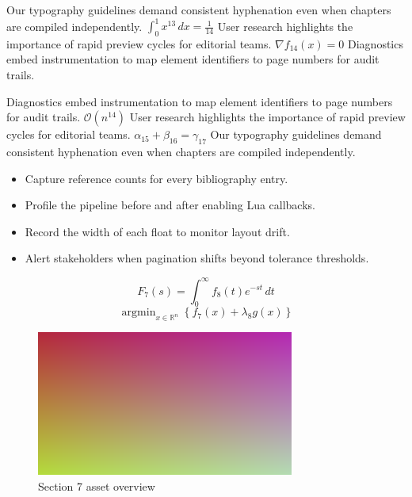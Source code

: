     Our typography guidelines demand consistent hyphenation even when chapters are compiled independently.  $\int_{0}^{1} x^{13} \, dx = \frac{1}{14}$  User research highlights the importance of rapid preview cycles for editorial teams.  $\nabla f_{14}(x) = 0$  Diagnostics embed instrumentation to map element identifiers to page numbers for audit trails.
    \par
  
    Diagnostics embed instrumentation to map element identifiers to page numbers for audit trails.  $\mathcal{O}(n^{14})$  User research highlights the importance of rapid preview cycles for editorial teams.  $\alpha_{15} + \beta_{16} = \gamma_{17}$  Our typography guidelines demand consistent hyphenation even when chapters are compiled independently.
    \par
  
    \begin{itemize}
      
    \item Capture reference counts for every bibliography entry.
    \item Profile the pipeline before and after enabling Lua callbacks.
    \item Record the width of each float to monitor layout drift.
    \item Alert stakeholders when pagination shifts beyond tolerance thresholds.
    \end{itemize}
\begin{equation}
\label{eq:sec7-eq1}
F_{7}(s) = \int_{0}^{\infty} f_{8}(t) e^{-st} \, dt
\end{equation}
\[
\operatorname{argmin}_{x \in \mathbb{R}^{n}} \left\{ f_{7}(x) + \lambda_{8} g(x) \right\}
\]

    \begin{figure}[htbp]
      \centering
      
          \includegraphics[width=0.82\linewidth]{../assets/images/placeholder2.png}
        
        \caption{Section 7 asset overview}
      
        \label{fig:fig-sec7}
      
    \end{figure}
  
